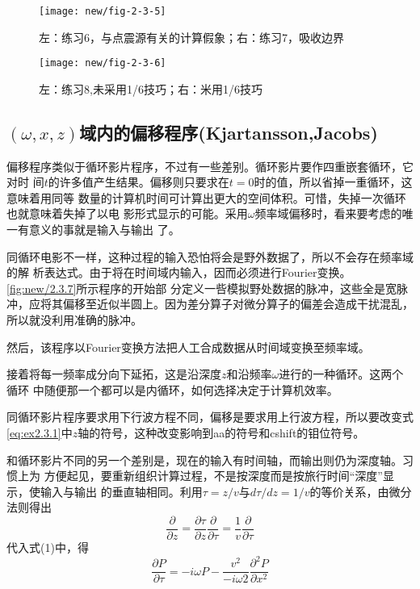 \begin{figure}[H]
\centering
\texttt{[image: new/fig-2-3-5]}
\caption[2-3-5]{左：练习6，与点震源有关的计算假象；右：练习7，吸收边界}
\label{fig:new/fig-2-3-5}
\end{figure}

\begin{figure}[H]
\centering
\texttt{[image: new/fig-2-3-6]}
\caption[2-3-6]{左：练习8,未采用1/6技巧；右：米用1/6技巧}
\label{fig:new/fig-2-3-6}
\end{figure}

\subsection{$(\omega,x,z)$域内的偏移程序(Kjartansson,Jacobs)}
偏移程序类似于循环影片程序，不过有一些差别。循环影片要作四重嵌套循环，它对时
间$t$的许多值产生结果。偏移则只要求在$t=0$时的值，所以省掉一重循环，这意味着用同等
数量的计算机时间可计算出更大的空间体积。可惜，失掉一次循环也就意味着失掉了以电
影形式显示的可能。采用$\omega$频率域偏移时，看来要考虑的唯一有意义的事就是输入与输出
了。

同循环电影不一样，这种过程的输入恐怕将会是野外数据了，所以不会存在频率域的解
析表达式。由于将在时间域内输入，因而必须进行Fourier变换。\ref{fig:new/2.3.7}所示程序的开始部
分定义一呰模拟野处数据的脉冲，这些全是宽脉冲，应将其偏移至近似半圆上。因为差分算子对微分算子的偏差会造成干扰混乱，所以就没利用准确的脉冲。

然后，该程序以Fourier变换方法把人工合成数据从时间域变换至频率域。

接着将每一频率成分向下延拓，这是沿深度$z$和沿频率$\omega$进行的一种循环。这两个循环
中随便那一个都可以是内循环，如何选择决定于计算机效率。

同循环影片程序要求用下行波方程不同，偏移是要求用上行波方程，所以要改变式
\ref{eq:ex2.3.1}中$z$轴的符号，这种改变影响到aa的符号和cshift的钼位符号。

和循环影片不同的另一个差别是，现在的输入有时间轴，而输出则仍为深度轴。习惯上为
方便起见，要重新组织计算过程，不是按深度而是按旅行时间“深度”显示，使输入与输出
的垂直轴相同。利用$\tau=z/v$与$d\tau/dz=1/v$的等价关系，由微分法则得出
\begin{equation}
\frac{\partial}{\partial z}=\frac{\partial\tau}{\partial z}\frac{\partial}{\partial \tau}=\frac{1}{v}\frac{\partial}{\partial \tau}
\label{eq:2.3.7}
\end{equation}
代入式(1)中，得
\begin{equation}
\frac{\partial P}{\partial \tau}= -i\omega P-\frac{v^2}{-i\omega 2}\frac{\partial^2 P}{\partial x^2}
\label{eq:2.3.8}
\end{equation}

